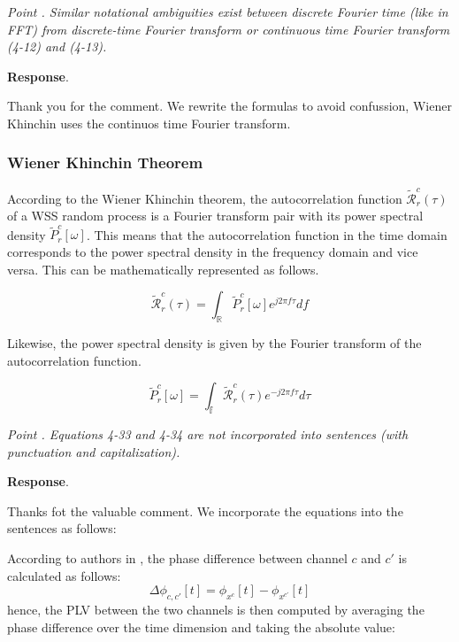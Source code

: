 \documentclass[runningheads]{llncs}
\newcommand{\Real}{\mathbb{R}}
\newenvironment{reviewer}{\setcounter{pointcounter}{1}}{}
\newcommand{\changes}[1]{\textcolor[rgb]{1.00,0.00,0.00}{#1}}
\newcommand{\point}[1]{\medskip \noindent
 \textsl{{\fontseries{b}\selectfont Point \thepointcounter}.
 \stepcounter{pointcounter} #1}}
\newcommand{\reply}{\medskip \noindent \textbf{Response}.\ }
\begin{document}
\begin{reviewer}
\point{Similar notational ambiguities exist between discrete Fourier time (like in FFT) from discrete-time Fourier transform or continuous time Fourier transform (4-12) and (4-13).}

\reply{
    Thank you for the comment. We rewrite the formulas to avoid confussion, Wiener Khinchin uses the continuos time Fourier transform.

    \subsubsection{Wiener Khinchin Theorem}

    According to the Wiener Khinchin theorem, the autocorrelation function \changes{$\mathcal{\tilde{R}}^{c}_{r}(\tau)$} of a WSS random process is a Fourier transform pair with its power spectral density \changes{$\tilde{P}^{c}_{r}[\omega]$}. This means that the autocorrelation function in the time domain corresponds to the power spectral density in the frequency domain and vice versa. This can be mathematically represented as follows.
    
    \changes{
    \begin{equation}
        \mathcal{\tilde{R}}^{c}_{r}(\tau) = \int_{\Real} \tilde{P}^{c}_{r}[\omega] e^{j 2\pi f \tau} df
    \end{equation}
    }
    
    Likewise, the power spectral density is given by the Fourier transform of the autocorrelation function.
    
    \changes{
    \begin{equation}
        \tilde{P}^{c}_{r}[\omega] = \int_{\mathbb{f}} \mathcal{\tilde{R}}^{c}_{r}(\tau) e^{-j 2\pi f \tau} d\tau
    \end{equation}
    }
}

\point{Equations 4-33 and 4-34 are not incorporated into sentences (with punctuation and capitalization). }

\reply{
    Thanks fot the valuable comment. We incorporate the equations into the sentences as follows:

    \changes{According to authors in \cite{cattai2021phase}, the phase difference between channel $c$ and $c'$ is calculated as follows: 
    }
    \changes{
    \begin{equation}
     \Delta \phi_{c,c'}[t] = \phi_{x^{c}}[t] - \phi_{x^{c'}}[t]    
    \end{equation}
    }
    \changes{
    hence, the PLV between the two channels is then computed by averaging the phase difference over the time dimension and taking the absolute value:}
    
}
\end{reviewer}
\end{document}
